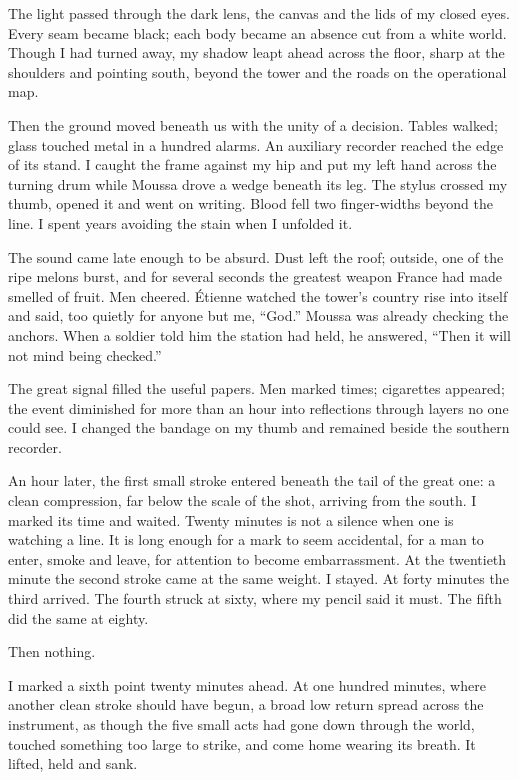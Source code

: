 The light passed through the dark lens, the canvas and the lids of my closed eyes. Every seam became black; each body became an absence cut from a white world. Though I had turned away, my shadow leapt ahead across the floor, sharp at the shoulders and pointing south, beyond the tower and the roads on the operational map.\par

Then the ground moved beneath us with the unity of a decision. Tables walked; glass touched metal in a hundred alarms. An auxiliary recorder reached the edge of its stand. I caught the frame against my hip and put my left hand across the turning drum while Moussa drove a wedge beneath its leg. The stylus crossed my thumb, opened it and went on writing. Blood fell two finger-widths beyond the line. I spent years avoiding the stain when I unfolded it.\par

The sound came late enough to be absurd. Dust left the roof; outside, one of the ripe melons burst, and for several seconds the greatest weapon France had made smelled of fruit. Men cheered. Étienne watched the tower's country rise into itself and said, too quietly for anyone but me, “God.” Moussa was already checking the anchors. When a soldier told him the station had held, he answered, “Then it will not mind being checked.”\par

The great signal filled the useful papers. Men marked times; cigarettes appeared; the event diminished for more than an hour into reflections through layers no one could see. I changed the bandage on my thumb and remained beside the southern recorder.\par

An hour later, the first small stroke entered beneath the tail of the great one: a clean compression, far below the scale of the shot, arriving from the south. I marked its time and waited. Twenty minutes is not a silence when one is watching a line. It is long enough for a mark to seem accidental, for a man to enter, smoke and leave, for attention to become embarrassment. At the twentieth minute the second stroke came at the same weight. I stayed. At forty minutes the third arrived. The fourth struck at sixty, where my pencil said it must. The fifth did the same at eighty.\par

Then nothing.\par

I marked a sixth point twenty minutes ahead. At one hundred minutes, where another clean stroke should have begun, a broad low return spread across the instrument, as though the five small acts had gone down through the world, touched something too large to strike, and come home wearing its breath. It lifted, held and sank.\par

